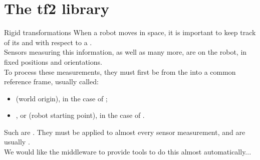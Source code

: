 
\section{The tf2 library}
\graphicspath{{figs/section6/}}

\begin{frame}{Rigid transformations}
	When a robot moves in space, it is important to keep track of its  and  with respect to a .\\
	\bigskip
	Sensors measuring this information, as well as many more, are  on the robot, in fixed positions and orientations.\\
	\bigskip
	To process these measurements, they must first be  from the  into a common reference frame, usually called:
	\begin{itemize}
		\item {} (world origin), in the case of ;
		\item {}, or  (robot starting point), in the case of .
	\end{itemize}
	\medskip
	Such  are . They must be applied to almost every sensor measurement, and are usually .\\
	\bigskip
	We would like the middleware to provide tools to do this almost automatically...
\end{frame}

